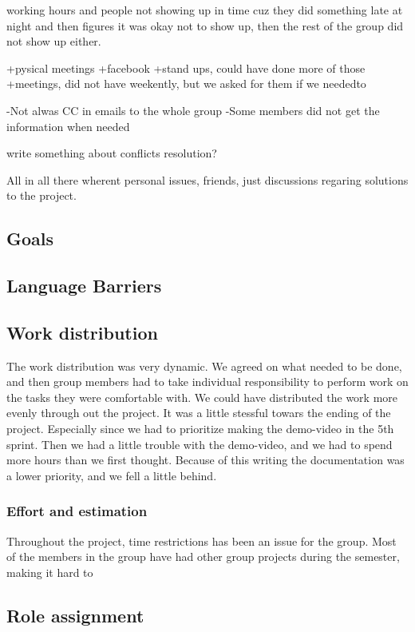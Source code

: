 working hours and people not showing up in time cuz they did something late at night and then figures it was okay not to show up, then the rest of the group did not show up either.


+pysical meetings
+facebook
+stand ups, could have done more of those
+meetings, did not have weekently, but we asked for them if we neededto

-Not alwas CC in emails to the whole group
-Some members did not get the information when needed 


write something about conflicts resolution?

All in all there wherent personal issues, friends, just discussions regaring solutions to the project. 

\subsection{Goals} 
\subsection{Language Barriers}

\subsection{Work distribution}

The work distribution was very dynamic. We agreed on what needed to be done, and then group members had to take individual responsibility to perform work on the tasks they were comfortable with.
We could have distributed the work more evenly through out the project. 
It was a little stessful towars the ending of the project. Especially since we had to prioritize making the demo-video in the 5th sprint. Then we had a little trouble with the demo-video, and we had to spend more hours than we first thought. Because of this writing the documentation was a lower priority, and we fell a little behind.  
  

\subsubsection{Effort and estimation}
Throughout the project, time restrictions has been an issue for the group. Most of the 
members in the group have had other group projects during the semester, making it hard to 


\subsection{Role assignment}
